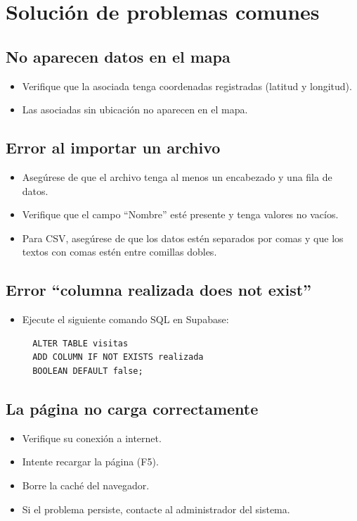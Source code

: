 \documentclass[12pt]{article}
\begin{document}
\section{Solución de problemas comunes}
\label{sec:problemas}

\subsection{No aparecen datos en el mapa}
\begin{itemize}[nosep]
  \item Verifique que la asociada tenga coordenadas registradas (latitud y longitud).
  \item Las asociadas sin ubicación no aparecen en el mapa.
\end{itemize}

\subsection{Error al importar un archivo}
\begin{itemize}[nosep]
  \item Asegúrese de que el archivo tenga al menos un encabezado y una fila de datos.
  \item Verifique que el campo ``Nombre'' esté presente y tenga valores no vacíos.
  \item Para CSV, asegúrese de que los datos estén separados por comas y que los textos con comas estén entre comillas dobles.
\end{itemize}

\subsection{Error ``columna realizada does not exist''}
\begin{itemize}[nosep]
  \item Ejecute el siguiente comando SQL en Supabase:
  \begin{verbatim}
  ALTER TABLE visitas 
  ADD COLUMN IF NOT EXISTS realizada 
  BOOLEAN DEFAULT false;
  \end{verbatim}
\end{itemize}

\subsection{La página no carga correctamente}
\begin{itemize}[nosep]
  \item Verifique su conexión a internet.
  \item Intente recargar la página (F5).
  \item Borre la caché del navegador.
  \item Si el problema persiste, contacte al administrador del sistema.
\end{itemize}
\end{document}
